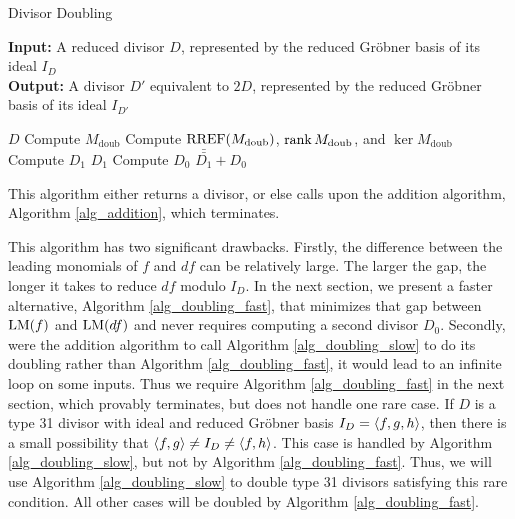 \begin{algorithm}
  \caption{Divisor Doubling}
  \label{alg_doubling_slow}
  {\bf Input:} A reduced divisor $D$, represented by the reduced Gr\"obner basis of its ideal $I_D$ \\
  {\bf Output:} A divisor $D'$ equivalent to $2D$, represented by the reduced Gr\"obner basis of its ideal $I_{D'}$
  \begin{algorithmic}[1]
      \State \Return $D$ \label{alg_doubling:return_0}
    \EndIf
    \State Compute $M_{\text{doub}}$
    \State Compute $\operatorname{RREF}(M_{\text{doub}})$, $\operatorname{rank} M_{\text{doub}}$, and $\ker M_{\text{doub}}$
    \State Compute $D_1$
      \State \Return $D_1$ \label{alg_doubling:return_1}
    \EndIf
    \State Compute $D_0$
    \State \Return $\bar{\bar{D_1}} + D_0$ \label{alg_doubling:return_2}
  \end{algorithmic}
\end{algorithm}

This algorithm either returns a divisor, or else calls upon the addition algorithm,
Algorithm \ref{alg_addition}, which terminates.

This algorithm has two significant drawbacks.
Firstly, the difference between the leading monomials of $f$ and $df$ can be relatively large.
The larger the gap, the longer it takes to reduce $df$ modulo $I_D$.
In the next section, we present a faster alternative, Algorithm \ref{alg_doubling_fast},
that minimizes that gap between $\operatorname{LM}(f)$ and $\operatorname{LM}(df)$ and never requires computing a second divisor $D_0$.
Secondly, were the addition algorithm to call Algorithm \ref{alg_doubling_slow} to do its doubling
rather than Algorithm \ref{alg_doubling_fast},
it would lead to an infinite loop on some inputs.
Thus we require Algorithm \ref{alg_doubling_fast} in the next section,
which provably terminates, but does not handle one rare case.
If $D$ is a type 31 divisor with ideal and reduced Gr\"obner basis $I_D = \left\langle f,g,h \right\rangle$,
then there is a small possibility that $\left\langle f,g \right\rangle \neq I_D \neq \left\langle f,h \right\rangle$.
This case is handled by Algorithm \ref{alg_doubling_slow}, but not by Algorithm \ref{alg_doubling_fast}.
Thus, we will use Algorithm \ref{alg_doubling_slow} to double type 31 divisors satisfying this rare condition.
All other cases will be doubled by Algorithm \ref{alg_doubling_fast}.





